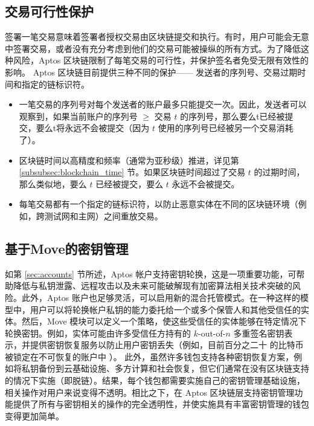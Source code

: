 \documentclass{article}
\begin{document}
\subsection{交易可行性保护}
\label{subsec:transaction_replay_protection}

签署一笔交易意味着签署者授权交易由区块链提交和执行。有时，用户可能会无意中签署交易，或者没有充分考虑到他们的交易可能被操纵的所有方式。为了降低这种风险，Aptos 区块链限制了每笔交易的可行性，并保护签名者免受无限有效性的影响。 Aptos 区块链目前提供三种不同的保护—— 发送者的序列号、交易过期时间和指定的链标识符。
\begin{itemize}
\item 一笔交易的序列号对每个发送者的账户最多只能提交一次。因此，发送者可以观察到，如果当前账户的序列号 $\geq$ 交易 $t$ 的序列号，那么要么t已经被提交，要么t将永远不会被提交（因为 $t$ 使用的序列号已经被另一个交易消耗了）。 
 
\item 区块链时间以高精度和频率（通常为亚秒级）推进，详见第 \ref{subsubsec:blockchain_time} 节。如果区块链时间超过了交易 $t$ 的过期时间，那么类似地，要么 $t$ 已经被提交，要么 $t$ 永远不会被提交。
 
\item 每笔交易都有一个指定的链标识符，以防止恶意实体在不同的区块链环境（例如，跨测试网和主网）之间重放交易。
\end{itemize}

\subsection{基于Move的密钥管理}

如第 \ref{sec:accounts} 节所述，Aptos 帐户支持密钥轮换，这是一项重要功能，可帮助降低与私钥泄露、远程攻击以及未来可能破解现有加密算法相关技术突破的风险。此外，Aptos 账户也足够灵活，可以启用新的混合托管模式。在一种这样的模型中，用户可以将轮换帐户私钥的能力委托给一个或多个保管人和其他受信任的实体。然后，Move 模块可以定义一个策略，使这些受信任的实体能够在特定情况下轮换密钥。例如，实体可能由许多受信任方持有的 $k$-out-of-$n$ 多重签名密钥表示，并提供密钥恢复服务以防止用户密钥丢失（例如，目前百分之二十 的比特币被锁定在不可恢复的账户中 \cite{lost_passwords}）。 此外，虽然许多钱包支持各种密钥恢复方案，例如将私钥备份到云基础设施、多方计算和社会恢复，但它们通常在没有区块链支持的情况下实施（即脱链）。结果，每个钱包都需要实施自己的密钥管理基础设施，相关操作对用户来说变得不透明。相比之下，在 Aptos 区块链层支持密钥管理功能提供了所有与密钥相关的操作的完全透明性，并使实施具有丰富密钥管理的钱包变得更加简单。
\end{document}
